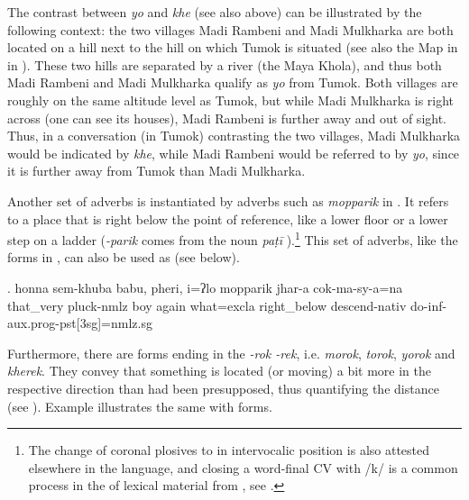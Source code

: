 The contrast between \emph{yo} and \emph{khe} (see also  above) can be illustrated by the following context: the two villages Madi Rambeni and Madi Mulkharka are both located on a hill next to the hill on which Tumok is situated (see also the Map in  in ). These two hills are separated by a river (the Maya Khola), and thus both Madi Rambeni and Madi Mulkharka qualify as \emph{yo}  from Tumok. Both villages are roughly on the same altitude level as Tumok, but while Madi Mulkharka is right across (one can see its houses), Madi Rambeni is further away and out of sight. Thus, in a conversation (in Tumok) contrasting the two villages, Madi Mulkharka would be indicated by \emph{khe}, while Madi Rambeni would be referred to by \emph{yo}, since it is further away from Tumok  than Madi Mulkharka.

Another set of adverbs is instantiated by adverbs such as \emph{mopparik}  in \Next. It refers to a place that is right below the point of reference, like a lower floor or a lower step on a ladder (\emph{-parik} comes from the  noun \emph{paṭī} ).\footnote{The change of  coronal plosives to  in intervocalic position is also attested elsewhere in the language, and closing a word-final CV  with /k/ is a common process in the  of lexical material from , see .} This set of adverbs, like the forms in \Last, can also be used  as   (see  below). 

\exg. honna              sem-khuba        babu, pheri, i=ʔlo       mopparik    jhar-a          cok-ma-sy-a=na\\
that\_very pluck{\sc -nmlz} boy again what{\sc =excla} right\_below descend{\sc -nativ} do{\sc -inf-aux.prog-pst[3sg]=nmlz.sg} \\
 


Furthermore, there are forms ending in the  \emph{-rok \ti -rek}, i.e. \emph{morok}, \emph{torok}, \emph{yorok} and \emph{kherek}. They convey that something is located (or moving) a bit more in the respective direction than had been presupposed, thus quantifying the distance (see \Next). Example \NNext illustrates the same with  forms. 


